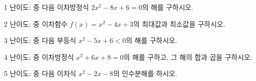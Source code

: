 \documentclass[fleqn]{article}
\begin{document}
   
1 난이도: 중 다음 이차방정식 \(2x^2 - 8x + 6 = 0\)의 해를 구하시오.

2 난이도: 중 이차함수 \(f(x) = x^2 - 4x + 3\)의 최대값과 최소값을
구하시오.

3 난이도: 중 다음 부등식 \(x^2 - 5x + 6 < 0\)의 해를 구하시오.

4 난이도: 중 이차방정식 \(x^2 + 6x + 8 = 0\)의 해를 구하고, 그 해의 합과
곱을 구하시오.

5 난이도: 중 다음 이차식 \(x^2 - 2x - 8\)의 인수분해를 하시오.
\end{document}
